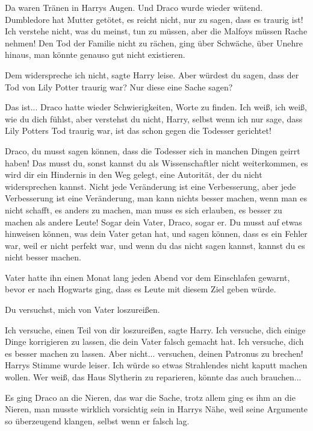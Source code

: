 Da waren Tränen in Harrys Augen. Und Draco wurde wieder wütend. \glqq{}Dumbledore
hat Mutter getötet, es reicht nicht, nur zu sagen, dass es traurig ist! Ich
verstehe nicht, was du meinst, tun zu müssen, aber die Malfoys müssen Rache
nehmen!\grqq{} Den Tod der Familie nicht zu rächen, ging über Schwäche, über
Unehre hinaus, man könnte genauso gut nicht existieren.

\glqq{}Dem widerspreche ich nicht\grqq{}, sagte Harry leise. \glqq{}Aber würdest
du sagen, dass der Tod von Lily Potter traurig war? Nur diese eine Sache
sagen?\grqq{}

\glqq{}Das ist...\grqq{} Draco hatte wieder Schwierigkeiten, Worte zu finden.
\glqq{}Ich weiß, ich weiß, wie du dich fühlst, aber verstehst du nicht, Harry,
selbst wenn ich nur sage, dass Lily Potters Tod traurig war, ist das schon gegen
die Todesser gerichtet!\grqq{}

\glqq{}Draco, du musst sagen können, dass die Todesser sich in manchen Dingen
geirrt haben! Das musst du, sonst kannst du als Wissenschaftler nicht
weiterkommen, es wird dir ein Hindernis in den Weg gelegt, eine Autorität, der
du nicht widersprechen kannst. Nicht jede Veränderung ist eine Verbesserung,
aber jede Verbesserung ist eine Veränderung, man kann nichts besser machen, wenn
man es nicht schafft, es anders zu machen, man muss es sich erlauben, es besser
zu machen als andere Leute! Sogar dein Vater, Draco, sogar er. Du musst auf
etwas hinweisen können, was dein Vater getan hat, und sagen können, dass es ein
Fehler war, weil er nicht perfekt war, und wenn du das nicht sagen kannst,
kannst du es nicht besser machen.\grqq{}

Vater hatte ihn einen Monat lang jeden Abend vor dem Einschlafen gewarnt, bevor
er nach Hogwarts ging, dass es Leute mit diesem Ziel geben würde.

\glqq{}Du versuchst, mich von Vater loszureißen.\grqq{}

\glqq{}Ich versuche, einen Teil von dir loszureißen\grqq{}, sagte Harry. \glqq
Ich versuche, dich einige Dinge korrigieren zu lassen, die dein Vater falsch
gemacht hat. Ich versuche, dich es besser machen zu lassen. Aber nicht...
versuchen, deinen Patronus zu brechen!\grqq{} Harrys Stimme wurde leiser. \glqq
Ich würde so etwas Strahlendes nicht kaputt machen wollen. Wer weiß, das Haus
Slytherin zu reparieren, könnte das auch brauchen...\grqq{}

Es ging Draco an die Nieren, das war die Sache, trotz allem ging es ihm an die
Nieren, man musste wirklich vorsichtig sein in Harrys Nähe, weil seine Argumente
so überzeugend klangen, selbst wenn er falsch lag.

